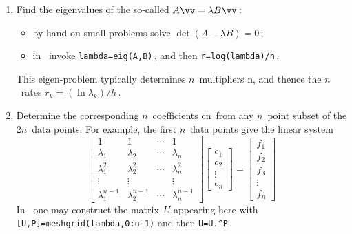 \begin{draft}
\begin{procedure}
\begin{enumerate}
\item Find the eigenvalues of the so-called  \(A\vv=\lambda B\vv\)\,: 
\begin{itemize}
\item by hand on small problems solve \(\det(A-\lambda B)=0\)\,;
\item in \script\ invoke \verb|lambda=eig(A,B)|\,, and then \verb|r=log(lambda)/h|\,.
\end{itemize}
This eigen-problem typically determines \(n\)~multipliers \hlist\lambda n, and thence the \(n\)~rates \(r_k=(\ln\lambda_k)/h\)\,.

\item Determine the corresponding \(n\)~coefficients \hlist cn\ from any \(n\)~point subset of the \(2n\)~data points.
For example, the first \(n\)~data points give the linear system 
\begin{equation*}
\begin{bmatrix} 1&1&\cdots&1
\\\lambda_1&\lambda_2&\cdots&\lambda_n
\\\lambda_1^2&\lambda_2^2&\cdots&\lambda_n^2
\\\vdots&\vdots&&\vdots
\\\lambda_1^{n-1}&\lambda_2^{n-1}&\cdots&\lambda_n^{n-1}
 \end{bmatrix}\begin{bmatrix} c_1\\c_2\\\vdots\\c_n \end{bmatrix}
 =\begin{bmatrix} f_1\\f_2\\f_3\\\vdots\\f_n \end{bmatrix}
\end{equation*}
In \script\ one may construct the matrix~\(U\) appearing here with \verb|[U,P]=meshgrid(lambda,0:n-1)| and then \verb|U=U.^P|\,.
\end{enumerate}
\end{procedure}

\end{draft}
